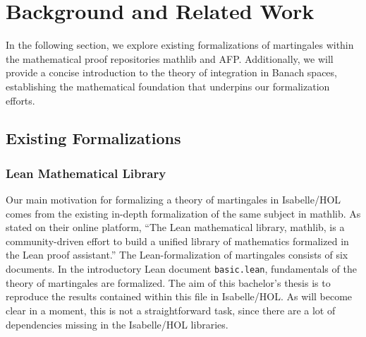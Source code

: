 ﻿%

\chapter{Background and Related Work}\label{chapter:background}

In the following section, we explore existing formalizations of martingales within the mathematical proof repositories \textsf{mathlib} and \textsf{\ac{AFP}}. Additionally, we will provide a concise introduction to the theory of integration in Banach spaces, establishing the mathematical foundation that underpins our formalization efforts.

\section{Existing Formalizations}

\subsection{Lean Mathematical Library}

Our main motivation for formalizing a theory of martingales in Isabelle/HOL comes from the existing in-depth formalization of the same subject in \textsf{mathlib}. As stated on their online platform, ``The Lean mathematical library, \textsf{mathlib}, is a community-driven effort to build a unified library of mathematics formalized in the Lean proof assistant.'' The Lean-formalization of martingales consists of six documents. In the introductory Lean document \texttt{basic.lean}, fundamentals of the theory of martingales are formalized. The aim of this bachelor's thesis is to reproduce the results contained within this file in Isabelle/HOL. As will become clear in a moment, this is not a straightforward task, since there are a lot of dependencies missing in the Isabelle/HOL libraries.

